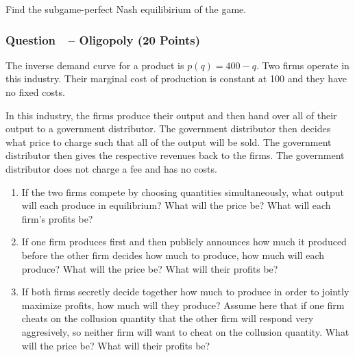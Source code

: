 \documentclass[12pt]{article}
\newcounter{question}[section]
\newcommand{\question}[1]{\refstepcounter{question}
  \subsubsection*{Question~\thequestion~-- #1}}
\newenvironment{subquestions}{
  \begin{enumerate}[label=(\roman*)]}{\end{enumerate}}
\begin{document}
\begin{subquestions}
\begin{center}
      \end{center}
      Find the subgame-perfect Nash equilibirium of the game.
    \end{subquestions}
\question{Oligopoly (20 Points)}
The inverse demand curve for a product is $p\left( q \right)=400-q$. Two firms
operate in this industry. Their marginal cost of production is constant at 100
and they have no fixed costs.

In this industry, the firms produce their output and then hand over all of
their output to a government distributor. The government distributor then
decides what price to charge such that all of the output will be sold. The
government distributor then gives the respective revenues back to the firms.
The government distributor does not charge a fee and has no costs.
\begin{subquestions}
  \item If the two firms compete by choosing quantities simultaneously, what
    output will each produce in equilibrium?  What will the price be? What will
    each firm's profits be?
  \item If one firm produces first and then publicly announces how much it
    produced before the other firm decides how much to produce, how much will
    each produce? What will the price be? What will their profits be?
  \item If both firms secretly decide together how much to produce in order to
    jointly maximize profits, how much will they produce? Assume here that if
    one firm cheats on the collusion quantity that the other firm will respond
    very aggresively, so neither firm will want to cheat on the collusion
    quantity. What will the price be? What will their profits be?
\end{subquestions}
\end{document}
